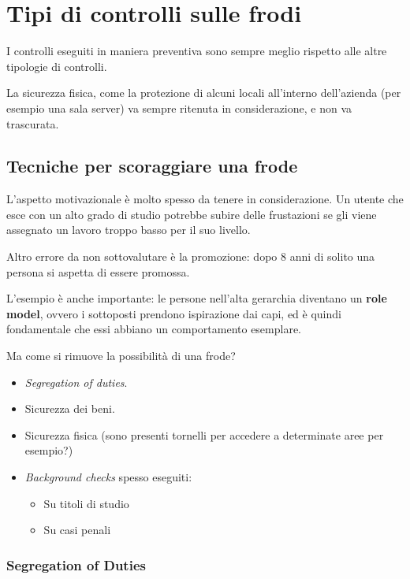 \section{Tipi di controlli sulle frodi}


I controlli eseguiti in maniera preventiva sono sempre meglio rispetto alle
altre tipologie di controlli.

La sicurezza fisica, come la protezione di alcuni locali all'interno
dell'azienda (per esempio una sala server) va sempre ritenuta in
considerazione, e non va trascurata.

\subsection{Tecniche per scoraggiare una frode}

L'aspetto motivazionale è molto spesso da tenere in considerazione.
Un utente che esce con un alto grado di studio potrebbe subire delle
frustazioni se gli viene assegnato un lavoro troppo basso per il suo livello.

Altro errore da non sottovalutare è la promozione: dopo 8 anni di solito una
persona si aspetta di essere promossa.

L'esempio è anche importante: le persone nell'alta gerarchia diventano un
\textbf{role model}, ovvero i sottoposti prendono ispirazione dai capi, ed è
quindi fondamentale che essi abbiano un comportamento esemplare.

Ma come si rimuove la possibilità di una frode?
\begin{itemize}
  \item \textit{Segregation of duties}.
  \item Sicurezza dei beni.
  \item Sicurezza fisica (sono presenti tornelli per accedere a determinate
aree per esempio?)
  \item \textit{Background checks} spesso eseguiti:
  \begin{itemize}
    \item Su titoli di studio
    \item Su casi penali
  \end{itemize}
\end{itemize}

\subsubsection{Segregation of Duties}

